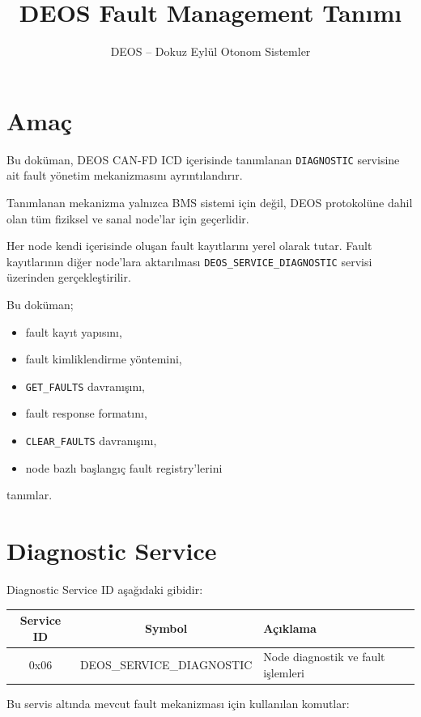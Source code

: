 \documentclass[a4paper,11pt]{article}
\title{\textbf{DEOS Fault Management Tanımı}}
\author{DEOS -- Dokuz Eylül Otonom Sistemler}
\date{}
\begin{document}
\maketitle

\section{Amaç}

Bu doküman, DEOS CAN-FD ICD içerisinde tanımlanan
\texttt{DIAGNOSTIC} servisine ait fault yönetim mekanizmasını
ayrıntılandırır.

Tanımlanan mekanizma yalnızca BMS sistemi için değil,
DEOS protokolüne dahil olan tüm fiziksel ve sanal node'lar için
geçerlidir.

Her node kendi içerisinde oluşan fault kayıtlarını yerel olarak tutar.
Fault kayıtlarının diğer node'lara aktarılması
\texttt{DEOS\_SERVICE\_DIAGNOSTIC} servisi üzerinden gerçekleştirilir.

Bu doküman;

\begin{itemize}[nosep]
    \item fault kayıt yapısını,
    \item fault kimliklendirme yöntemini,
    \item \texttt{GET\_FAULTS} davranışını,
    \item fault response formatını,
    \item \texttt{CLEAR\_FAULTS} davranışını,
    \item node bazlı başlangıç fault registry'lerini
\end{itemize}

tanımlar.

\section{Diagnostic Service}

Diagnostic Service ID aşağıdaki gibidir:

\begin{center}
\begin{tabular}{c c l}
\toprule
\textbf{Service ID} & \textbf{Symbol} & \textbf{Açıklama} \\
\midrule
0x06 & DEOS\_SERVICE\_DIAGNOSTIC & Node diagnostik ve fault işlemleri \\
\bottomrule
\end{tabular}
\end{center}

Bu servis altında mevcut fault mekanizması için kullanılan komutlar:
\end{document}
